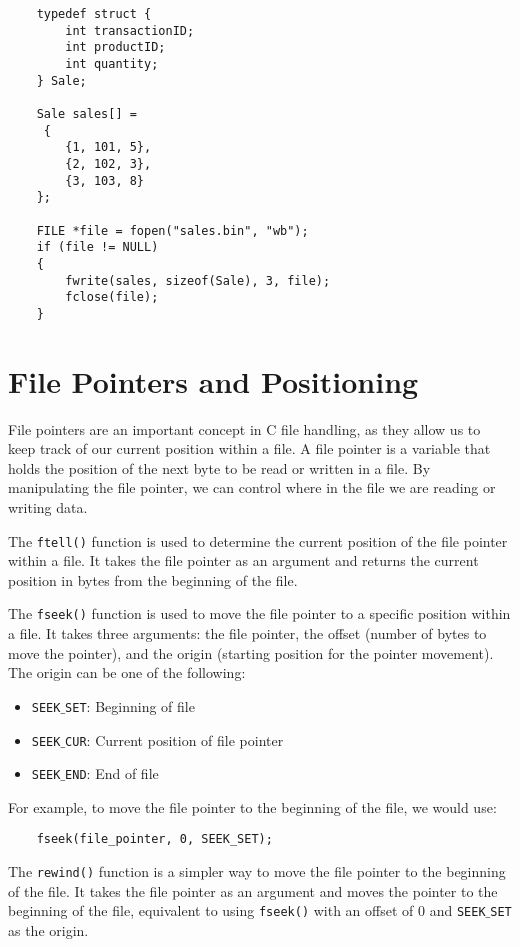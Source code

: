 \begin{verbatim}
	typedef struct {
		int transactionID;
		int productID;
		int quantity;
	} Sale;
	
	Sale sales[] =
	 {
		{1, 101, 5},
		{2, 102, 3},
		{3, 103, 8}
	};
	
	FILE *file = fopen("sales.bin", "wb");
	if (file != NULL) 
	{
		fwrite(sales, sizeof(Sale), 3, file);
		fclose(file);
	}
\end{verbatim}


\section{File Pointers and Positioning}
File pointers are an important concept in C file handling, as they allow us to
keep track of our current position within a file. A file pointer is a variable
that holds the position of the next byte to be read or written in a file. By
manipulating the file pointer, we can control where in the file we are reading
or writing data.

The {\tt ftell()} function is used to determine the current position of the file
pointer within a file. It takes the file pointer as an argument and returns the
current position in bytes from the beginning of the file.

The {\tt fseek()} function is used to move the file pointer to a specific
position within a file. It takes three arguments: the file pointer, the offset
(number of bytes to move the pointer), and the origin (starting position for
the pointer movement). The origin can be one of the following:

\begin{itemize}
	\item {\tt SEEK$\_$SET}: Beginning of file
	\item {\tt SEEK$\_$CUR}: Current position of file pointer
	\item {\tt SEEK$\_$END}: End of file
\end{itemize}

For example, to move the file pointer to the beginning of the file, we would use:

\begin{verbatim}
	fseek(file_pointer, 0, SEEK_SET);
\end{verbatim}

The {\tt rewind()} function is a simpler way to move the file pointer to the
beginning of the file. It takes the file pointer as an argument and moves the
pointer to the beginning of the file, equivalent to using {\tt fseek()} with
an offset of 0 and {\tt SEEK$\_$SET} as the origin.

